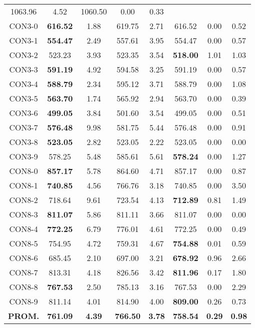 \begin{table}[h]
\begin{tabular}{c c c c c c c c}
1063.96 & 4.52 & 1060.50 & 0.00
 & 0.33\\CON3-0 & \bf{616.52} & 1.88 & 
619.75 & 2.71 & 616.52 & 0.00
 & 0.52\\CON3-1 & \bf{554.47} & 2.49 & 
557.61 & 3.95 & 554.47 & 0.00
 & 0.57\\CON3-2 & 523.23 & 3.93 & 
523.35 & 3.54 & \bf{518.00} & 
1.01 & 1.03\\CON3-3 & \bf{591.19} & 4.92 & 
594.58 & 3.25 & 591.19 & 0.00
 & 0.57\\CON3-4 & \bf{588.79} & 2.34 & 
595.12 & 3.71 & 588.79 & 0.00
 & 1.08\\CON3-5 & \bf{563.70} & 1.74 & 
565.92 & 2.94 & 563.70 & 0.00
 & 0.39\\CON3-6 & \bf{499.05} & 3.84 & 
501.60 & 3.54 & 499.05 & 0.00
 & 0.51\\CON3-7 & \bf{576.48} & 9.98 & 
581.75 & 5.44 & 576.48 & 0.00
 & 0.91\\CON3-8 & \bf{523.05} & 2.82 & 
523.05 & 2.22 & 523.05 & 0.00
 & 0.00\\
CON3-9 & 578.25 & 5.48 & 
585.61 & 5.61 & \bf{578.24} & 
0.00 & 1.27\\CON8-0 & \bf{857.17} & 5.78 & 
864.60 & 4.71 & 857.17 & 0.00
 & 0.87\\CON8-1 & \bf{740.85} & 4.56 & 
766.76 & 3.18 & 740.85 & 0.00
 & 3.50\\CON8-2 & 718.64 & 9.61 & 
723.54 & 4.13 & \bf{712.89} & 
0.81 & 1.49\\CON8-3 & \bf{811.07} & 5.86 & 
811.11 & 3.66 & 811.07 & 0.00
 & 0.00\\CON8-4 & \bf{772.25} & 6.79 & 
776.01 & 4.61 & 772.25 & 0.00
 & 0.49\\CON8-5 & 754.95 & 4.72 & 
759.31 & 4.67 & \bf{754.88} & 
0.01 & 0.59\\CON8-6 & 685.45 & 2.10 & 
697.00 & 3.21 & \bf{678.92} & 
0.96 & 2.66\\CON8-7 & 813.31 & 4.18 & 
826.56 & 3.42 & \bf{811.96} & 
0.17 & 1.80\\CON8-8 & \bf{767.53} & 2.50 & 
785.13 & 3.16 & 767.53 & 0.00
 & 2.29\\CON8-9 & 811.14 & 4.01 & 
814.90 & 4.00 & \bf{809.00} & 
0.26 & 0.73\\\bf{PROM.} & 
\bf{761.09} & \bf{4.39} & \bf{766.50} & \bf{3.78} & \bf{758.54} & \bf{0.29} & \bf{0.98}\\[1ex]\hline
\end{tabular}
\label{table:nonlin}
\end{table}
